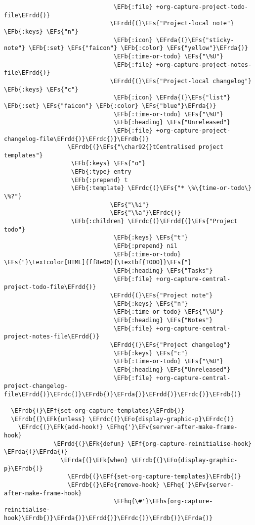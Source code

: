 \documentclass[c]{article}
\theoremstyle{plain}%
\theoremstyle{definition}
\theoremstyle{remark}
\newcommand{\EFs}[1]{\textcolor{EFs}{#1}} %
\newcommand{\EFk}[1]{\textcolor{EFk}{#1}} %
\newcommand{\EFb}[1]{\textcolor{EFb}{#1}} %
\newcommand{\EFf}[1]{\textcolor{EFf}{#1}} %
\newcommand{\EFv}[1]{\textcolor{EFv}{#1}} %
\newcommand{\EFo}[1]{\textcolor{EFo}{#1}} %
\newcommand{\EFhq}[1]{\textcolor{EFhq}{#1}} %
\newcommand{\EFhs}[1]{\textcolor{EFhs}{#1}} %
\newcommand{\EFrda}[1]{\textcolor{EFrda}{#1}} %
\newcommand{\EFrdb}[1]{\textcolor{EFrdb}{#1}} %
\newcommand{\EFrdc}[1]{\textcolor{EFrdc}{#1}} %
\newcommand{\EFrdd}[1]{\textcolor{EFrdd}{#1}} %
\begin{document}
\begin{Code}
\begin{Verbatim}
                               \EFb{:file} +org-capture-project-todo-file\EFrdd{)}
                              \EFrdd{(}\EFs{"Project-local note"} \EFb{:keys} \EFs{"n"}
                               \EFb{:icon} \EFrda{(}\EFs{"sticky-note"} \EFb{:set} \EFs{"faicon"} \EFb{:color} \EFs{"yellow"}\EFrda{)}
                               \EFb{:time-or-todo} \EFs{"\%U"}
                               \EFb{:file} +org-capture-project-notes-file\EFrdd{)}
                              \EFrdd{(}\EFs{"Project-local changelog"} \EFb{:keys} \EFs{"c"}
                               \EFb{:icon} \EFrda{(}\EFs{"list"} \EFb{:set} \EFs{"faicon"} \EFb{:color} \EFs{"blue"}\EFrda{)}
                               \EFb{:time-or-todo} \EFs{"\%U"}
                               \EFb{:heading} \EFs{"Unreleased"}
                               \EFb{:file} +org-capture-project-changelog-file\EFrdd{)}\EFrdc{)}\EFrdb{)}
                  \EFrdb{(}\EFs{"\char92{}tCentralised project templates"}
                   \EFb{:keys} \EFs{"o"}
                   \EFb{:type} entry
                   \EFb{:prepend} t
                   \EFb{:template} \EFrdc{(}\EFs{"* \%\{time-or-todo\} \%?"}
                              \EFs{"\%i"}
                              \EFs{"\%a"}\EFrdc{)}
                   \EFb{:children} \EFrdc{(}\EFrdd{(}\EFs{"Project todo"}
                               \EFb{:keys} \EFs{"t"}
                               \EFb{:prepend} nil
                               \EFb{:time-or-todo} \EFs{"}\textcolor[HTML]{ff8e00}{\textbf{TODO}}\EFs{"}
                               \EFb{:heading} \EFs{"Tasks"}
                               \EFb{:file} +org-capture-central-project-todo-file\EFrdd{)}
                              \EFrdd{(}\EFs{"Project note"}
                               \EFb{:keys} \EFs{"n"}
                               \EFb{:time-or-todo} \EFs{"\%U"}
                               \EFb{:heading} \EFs{"Notes"}
                               \EFb{:file} +org-capture-central-project-notes-file\EFrdd{)}
                              \EFrdd{(}\EFs{"Project changelog"}
                               \EFb{:keys} \EFs{"c"}
                               \EFb{:time-or-todo} \EFs{"\%U"}
                               \EFb{:heading} \EFs{"Unreleased"}
                               \EFb{:file} +org-capture-central-project-changelog-file\EFrdd{)}\EFrdc{)}\EFrdb{)}\EFrda{)}\EFrdd{)}\EFrdc{)}\EFrdb{)}

  \EFrdb{(}\EFf{set-org-capture-templates}\EFrdb{)}
  \EFrdb{(}\EFk{unless} \EFrdc{(}\EFo{display-graphic-p}\EFrdc{)}
    \EFrdc{(}\EFk{add-hook!} \EFhq{'}\EFv{server-after-make-frame-hook}
              \EFrdd{(}\EFk{defun} \EFf{org-capture-reinitialise-hook} \EFrda{(}\EFrda{)}
                \EFrda{(}\EFk{when} \EFrdb{(}\EFo{display-graphic-p}\EFrdb{)}
                  \EFrdb{(}\EFf{set-org-capture-templates}\EFrdb{)}
                  \EFrdb{(}\EFo{remove-hook} \EFhq{'}\EFv{server-after-make-frame-hook}
                               \EFhq{\#'}\EFhs{org-capture-reinitialise-hook}\EFrdb{)}\EFrda{)}\EFrdd{)}\EFrdc{)}\EFrdb{)}\EFrda{)}
\end{Verbatim}
\end{Code}
\end{document}
